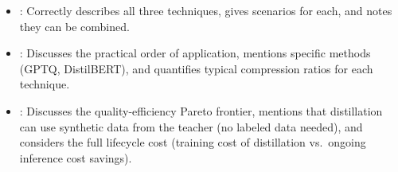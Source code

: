 \begin{interviewq}

\goodgreat
\begin{itemize}
    \item {}: Correctly describes all three techniques, gives scenarios
          for each, and notes they can be combined.
    \item {}: Discusses the practical order of application, mentions
          specific methods (GPTQ, DistilBERT), and quantifies typical compression
          ratios for each technique.
    \item {}: Discusses the quality-efficiency Pareto frontier, mentions
          that distillation can use synthetic data from the teacher (no labeled data
          needed), and considers the full lifecycle cost (training cost of distillation
          vs.\ ongoing inference cost savings).
\end{itemize}

\end{interviewq}

\vspace{0.5em}

